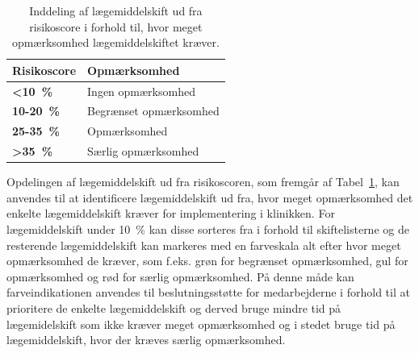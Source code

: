 \vspace{0.5cm}
\begin{table}[H]
\caption{Inddeling af lægemiddelskift ud fra risikoscore i forhold til, hvor meget opmærksomhed lægemiddelskiftet kræver.}
\vspace{2mm}
\label{table:cutoff}
\centering
\begin{tabular}{l|l}
\rowcolor[HTML]{C0C0C0}\textbf{Risikoscore} & \textbf{ Opmærksomhed} \\ \hline
\cellcolor[HTML]{C0C0C0} \textbf{<10~\%} & Ingen opmærksomhed \\ \hline
\cellcolor[HTML]{C0C0C0}\textbf{10-20~\%} & Begrænset opmærksomhed \\ \hline
\cellcolor[HTML]{C0C0C0}\textbf{25-35~\% }& Opmærksomhed  \\ \hline
\cellcolor[HTML]{C0C0C0}\textbf{>35~\%} & Særlig opmærksomhed \\
\end{tabular}
\end{table}

Opdelingen af lægemiddelskift ud fra risikoscoren, som fremgår af Tabel~\ref{table:cutoff}, kan anvendes til at identificere lægemiddelskift ud fra, hvor meget opmærksomhed det enkelte lægemiddelskift kræver for implementering i klinikken. For lægemiddelskift under 10~\% kan disse sorteres fra i forhold til skiftelisterne og de resterende lægemiddelskift kan markeres med en farveskala alt efter hvor meget opmærksomhed de kræver, som f.eks. grøn for begrænset opmærksomhed, gul for opmærksomhed og rød for særlig opmærksomhed. På denne måde  kan farveindikationen anvendes til beslutningsstøtte for medarbejderne i forhold til at prioritere de enkelte lægemiddelskift og derved bruge mindre tid på lægemidelskift som ikke kræver meget opmærksomhed og i stedet bruge tid på lægemiddelskift, hvor der kræves særlig opmærksomhed.

